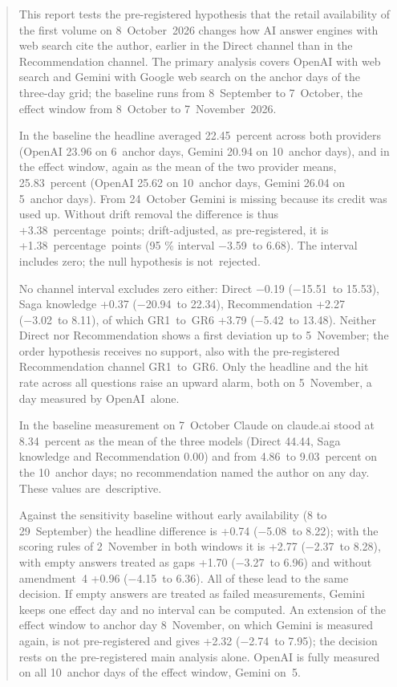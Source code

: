 \documentclass[11pt]{article}
\begin{document}
\begin{abstract}
This report tests the pre-registered hypothesis that the retail availability of the first volume on 8~October~2026 changes how AI answer engines with web search cite the author, earlier in the Direct channel than in the Recommendation channel. The primary analysis covers OpenAI with web search and Gemini with Google web search on the anchor days of the three-day grid; the baseline runs from 8~September to 7~October, the effect window from 8~October to 7~November~2026.

In the baseline the headline averaged 22.45~percent across both providers (OpenAI 23.96 on 6~anchor days, Gemini 20.94 on 10~anchor days), and in the effect window, again as the mean of the two provider means, 25.83~percent (OpenAI 25.62 on 10~anchor days, Gemini 26.04 on 5~anchor days). From 24~October Gemini is missing because its credit was used up. Without drift removal the difference is thus +3.38~percentage~points; drift-adjusted, as pre-registered, it is +1.38~percentage~points (95 \% interval −3.59~to 6.68). The interval includes zero; the null hypothesis is not~\mbox{rejected.}

No channel interval excludes zero either: Direct −0.19 (−15.51~to 15.53), Saga knowledge +0.37 (−20.94~to 22.34), Recommendation +2.27 (−3.02~to 8.11), of which GR1~to~GR6 +3.79 (−5.42~to 13.48). Neither Direct nor Recommendation shows a first deviation up to 5~November; the order hypothesis receives no support, also with the pre-registered Recommendation channel GR1~to~GR6. Only the headline and the hit rate across all questions raise an upward alarm, both on 5~November, a day measured by OpenAI~\mbox{alone.}

In the baseline measurement on 7~October Claude on claude.ai stood at 8.34~percent as the mean of the three models (Direct 44.44, Saga knowledge and Recommendation 0.00) and from 4.86~to 9.03~percent on the 10~anchor days; no recommendation named the author on any day. These values are~\mbox{descriptive.}

Against the sensitivity baseline without early availability (8 to 29~September) the headline difference is +0.74 (−5.08~to 8.22); with the scoring rules of 2~November in both windows it is +2.77 (−2.37~to 8.28), with empty answers treated as gaps +1.70 (−3.27~to 6.96) and without amendment~4 +0.96 (−4.15~to 6.36). All of these lead to the same decision. If empty answers are treated as failed measurements, Gemini keeps one effect day and no interval can be computed. An extension of the effect window to anchor day 8~November, on which Gemini is measured again, is not pre-registered and gives +2.32 (−2.74~to 7.95); the decision rests on the pre-registered main analysis alone. OpenAI is fully measured on all 10~anchor days of the effect window, Gemini on~\mbox{5.}

\end{abstract}
\end{document}
